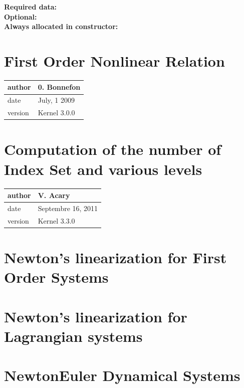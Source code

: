 \documentclass[10pt]{report}
\begin{document}
\textbf{Required data:}\\

\textbf{Optional:}\\

\textbf{Always allocated in constructor:} \\

\chapter{First Order Nonlinear Relation }

\begin{table}[!ht]
  \begin{tabular}{|l|l|}
    \hline
    author  & 0. Bonnefon \\
    \hline
    date    & July, 1 2009 \\ 
    \hline
    version & Kernel 3.0.0 \\
    \hline
  \end{tabular}
\end{table}

\chapter{Computation of the number of Index Set and various levels}
\begin{table}[!ht]
  \begin{tabular}{|l|l|}
    \hline
    author  & V. Acary \\
    \hline
    date    & Septembre 16, 2011 \\ 
    \hline
    version & Kernel 3.3.0 \\
    \hline
  \end{tabular}
\end{table}




\chapter{Newton's linearization for First Order Systems}

\chapter{Newton's linearization for Lagrangian systems}

\chapter{NewtonEuler Dynamical Systems}

\end{document}
